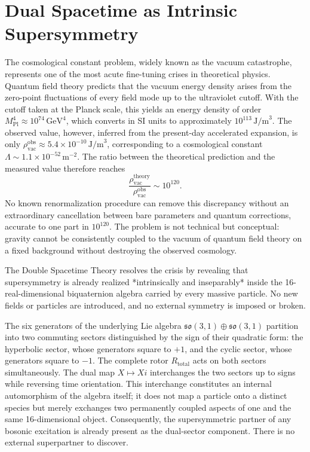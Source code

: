 \documentclass[dvipdfmx,11pt,a4paper]{article}
\begin{document}
\section{Dual Spacetime as Intrinsic Supersymmetry}
\label{sec:susy}

The cosmological constant problem, widely known as the vacuum catastrophe, represents one of the most acute fine-tuning crises in theoretical physics. Quantum field theory predicts that the vacuum energy density arises from the zero-point fluctuations of every field mode up to the ultraviolet cutoff. With the cutoff taken at the Planck scale, this yields an energy density of order \(M_\text{Pl}^4 \approx 10^{74}\,\text{GeV}^4\), which converts in SI units to approximately \(10^{113}\,\text{J/m}^3\). The observed value, however, inferred from the present-day accelerated expansion, is only \(\rho_\text{vac}^\text{obs} \approx 5.4 \times 10^{-10}\,\text{J/m}^3\), corresponding to a cosmological constant \(\Lambda \sim 1.1 \times 10^{-52}\,\text{m}^{-2}\). The ratio between the theoretical prediction and the measured value therefore reaches
\[
\frac{\rho_\text{vac}^\text{theory}}{\rho_\text{vac}^\text{obs}} \sim 10^{120}.
\]
No known renormalization procedure can remove this discrepancy without an extraordinary cancellation between bare parameters and quantum corrections, accurate to one part in \(10^{120}\). The problem is not technical but conceptual: gravity cannot be consistently coupled to the vacuum of quantum field theory on a fixed background without destroying the observed cosmology.

The Double Spacetime Theory resolves the crisis by revealing that supersymmetry is already realized *intrinsically and inseparably* inside the 16-real-dimensional biquaternion algebra carried by every massive particle. No new fields or particles are introduced, and no external symmetry is imposed or broken.

The six generators of the underlying Lie algebra \(\mathfrak{so}(3,1) \oplus \mathfrak{so}(3,1)\) partition into two commuting sectors distinguished by the sign of their quadratic form: the hyperbolic sector, whose generators square to \(+1\), and the cyclic sector, whose generators square to \(-1\). The complete rotor \(R_\text{total}\) acts on both sectors simultaneously. The dual map \(X \mapsto Xi\) interchanges the two sectors up to signs while reversing time orientation. This interchange constitutes an internal automorphism of the algebra itself; it does not map a particle onto a distinct species but merely exchanges two permanently coupled aspects of one and the same 16-dimensional object. Consequently, the supersymmetric partner of any bosonic excitation is already present as the dual-sector component. There is no external superpartner to discover.
\end{document}
